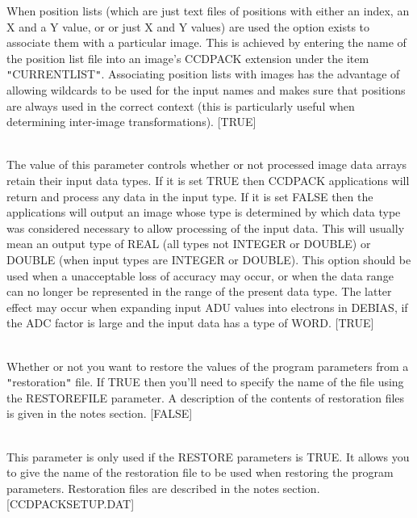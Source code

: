 \documentclass[twoside,11pt]{article}
\newcommand{\htmlref}[2]{#1}
\newcommand{\xlabel}[1]{}
\renewcommand{\_}{\texttt{\symbol{95}}}
\newcommand{\qt}[1]{{\tt "}#1{\tt "}}
\newcommand{\xroutine}[1]{\htmlref{{\sc #1}}{#1}}
\newcommand{\sstsubsection}[1]{ \item[{#1}] \mbox{} \\}
\newcommand{\sstsubsection}[1]{\item[{#1}]}
\begin{document}
{{{         When position lists (which are just text files of positions
         with either an index, an X and a Y value, or or just X and Y
         values) are used the option exists to associate them with a
         particular image. This is achieved by entering the name of the
         position list file into an image's CCDPACK extension under the
         item \qt{CURRENT\_LIST}. Associating position lists with images has
         the advantage of allowing wildcards to be used for the input
         names and makes sure that positions are always used in the
         correct context (this is particularly useful when determining
         inter-image transformations).
         [TRUE]
      }
      \sstsubsection{
         PRESERVE = \_LOGICAL (Read and Write)
      } {
         The value of this parameter controls whether or not processed
         image data arrays retain their input data types. If it is set
         TRUE then CCDPACK applications will return and process any
         data in the input type. If it is set FALSE then the
         applications will output an image whose type is determined by
         which data type was considered necessary to allow processing
         of the input data. This will usually mean an output type of
         \_REAL (all types not \_INTEGER or \_DOUBLE) or \_DOUBLE (when
         input types are \_INTEGER or \_DOUBLE). This option should be
         used when a unacceptable loss of accuracy may occur, or when
         the data range can no longer be represented in the range of
         the present data type. The latter effect may occur when
         expanding input ADU values into electrons in \xroutine{DEBIAS}, if the
         ADC factor is large and the input data has a type of \_WORD.
         [TRUE]
      }
      \sstsubsection{
         RESTORE = \_LOGICAL (Read)
      } {
         Whether or not you want to restore the values of the program
         parameters from a \qt{restoration} file. If TRUE then you'll
         need to specify the name of the file using the RESTOREFILE
         parameter. A description of the contents of restoration files is
         given in the notes section.
         [FALSE]
      }
      \sstsubsection{
         RESTOREFILE = FILENAME (Read)
      } {
         This parameter is only used if the RESTORE parameters is TRUE.
         It allows you to give the name of the restoration file to be used
         when restoring the program parameters. Restoration files are
         described in the notes section.
         [CCDPACK\_SETUP.DAT]
      }
      \sstsubsection{
         RNOISE = \_DOUBLE (Read and Write) \xlabel{CCDrnoise}
}}}
\end{document}
